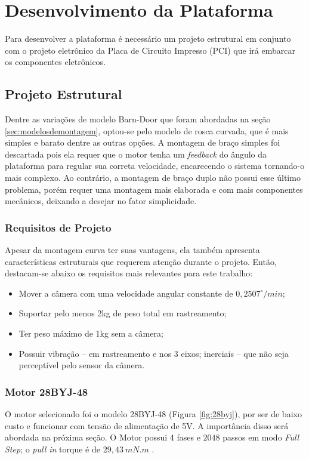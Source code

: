 \chapter{Desenvolvimento da Plataforma}

Para desenvolver a plataforma é necessário um projeto estrutural em conjunto com o projeto eletrônico da Placa de Circuito Impresso (PCI) que irá embarcar os componentes eletrônicos. 

\section{Projeto Estrutural}
Dentre as variações de modelo Barn-Door que foram abordadas na seção \ref{sec:modelosdemontagem}, optou-se pelo modelo de rosca curvada, que é mais simples e barato dentre as outras opções. A montagem de braço simples foi descartada pois ela requer que o motor tenha um \textit{feedback} do ângulo da plataforma para regular sua correta velocidade, encarecendo o sistema tornando-o mais complexo. Ao contrário, a montagem de braço duplo não possui esse último problema, porém requer uma montagem mais elaborada e com mais componentes mecânicos, deixando a desejar no fator simplicidade. 

\subsection{Requisitos de Projeto}
Apesar da montagem curva ter suas vantagens, ela também apresenta características estruturais que requerem atenção durante o projeto. Então, destacam-se abaixo os requisitos mais relevantes para este trabalho:

\begin{itemize}
	\item Mover a câmera com uma velocidade angular constante de $ 0,2507^{\circ}/min $;
	\item Suportar pelo menos 2kg de peso total em rastreamento;
	\item Ter peso máximo de 1kg sem a câmera;
	\item Possuir vibração -- em rastreamento e nos 3 eixos; inerciais -- que não seja perceptível pelo sensor da câmera.
\end{itemize}

\subsection{Motor 28BYJ-48}
O motor selecionado foi o modelo 28BYJ-48 (Figura \ref{fig:28byj}), por ser de baixo custo e funcionar com tensão de alimentação de 5V. A importância disso será abordada na próxima seção. O Motor possui 4 fases e $ 2048 $ passos em modo\textit{ Full Step}; o \textit{pull in} torque é de $ 29,43~mN.m $ \cite{man:stepperMotor}.

